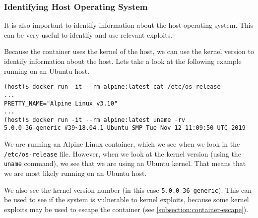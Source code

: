 \subsubsection{Identifying Host Operating System}
It is also important to identify information about the host operating system. This can be very useful to identify and use relevant exploits. 

Because the container uses the kernel of the host, we can use the kernel version to identify information about the host. Lets take a look at the following example running on an Ubuntu host.
\begin{lstlisting}[caption={\lstinline{/etc/os-release} and \lstinline{uname} differ},captionpos=b]
(host)$ docker run -it --rm alpine:latest cat /etc/os-release 
...
PRETTY_NAME="Alpine Linux v3.10"
...
(host)$ docker run -it --rm alpine:latest uname -rv
5.0.0-36-generic #39~18.04.1-Ubuntu SMP Tue Nov 12 11:09:50 UTC 2019
\end{lstlisting}

We are running an Alpine Linux container, which we see when we look in the \lstinline{/etc/os-release} file. However, when we look at the kernel version (using the \lstinline{uname} command), we see that we are using an Ubuntu kernel. That means that we are most likely running on an Ubuntu host.

\hfill

We also see the kernel version number (in this case \lstinline{5.0.0-36-generic}). This can be used to see if the system is vulnerable to kernel exploits, because some kernel exploits may be used to escape the container (see \autoref{subsection:container-escape}).
